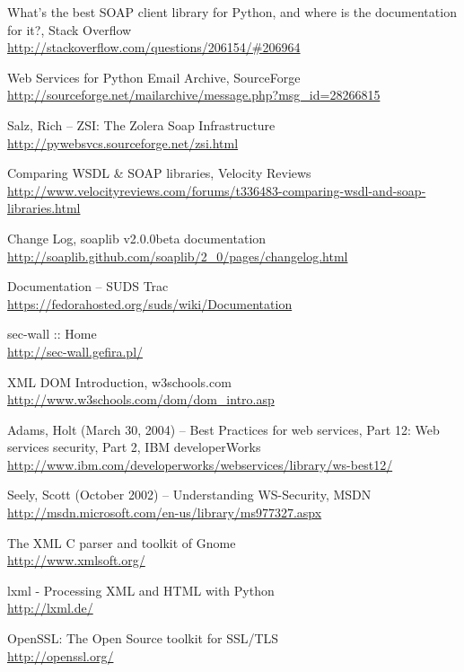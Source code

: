 \begin{thebibliography}{99}
What's the best SOAP client library for Python, and where is the documentation for it?, Stack Overflow\\
\url{http://stackoverflow.com/questions/206154/#206964}

Web Services for Python Email Archive, SourceForge\\
\url{http://sourceforge.net/mailarchive/message.php?msg_id=28266815}

Salz, Rich -- ZSI: The Zolera Soap Infrastructure\\
\url{http://pywebsvcs.sourceforge.net/zsi.html}

Comparing WSDL & SOAP libraries, Velocity Reviews\\
\url{http://www.velocityreviews.com/forums/t336483-comparing-wsdl-and-soap-libraries.html}

Change Log, soaplib v2.0.0beta documentation\\
\url{http://soaplib.github.com/soaplib/2_0/pages/changelog.html}

Documentation -- SUDS Trac\\
\url{https://fedorahosted.org/suds/wiki/Documentation}

sec-wall :: Home\\
\url{http://sec-wall.gefira.pl/}

XML DOM Introduction, w3schools.com\\
\url{http://www.w3schools.com/dom/dom_intro.asp}

Adams, Holt (March 30, 2004) -- Best Practices for web services, Part 12: Web services security, Part 2, IBM developerWorks\\
\url{http://www.ibm.com/developerworks/webservices/library/ws-best12/}

Seely, Scott (October 2002) -- Understanding WS-Security, MSDN\\
\url{http://msdn.microsoft.com/en-us/library/ms977327.aspx}

The XML C parser and toolkit of Gnome\\
\url{http://www.xmlsoft.org/}

lxml - Processing XML and HTML with Python\\
\url{http://lxml.de/}

OpenSSL: The Open Source toolkit for SSL/TLS\\
\url{http://openssl.org/}


\end{thebibliography}
